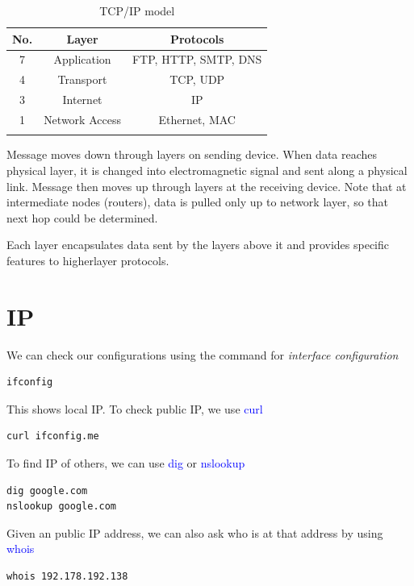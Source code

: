 \documentclass[a4paper, 12pt]{book} %
\begin{document}
\begin{longtable}{|c|c|c|} \hline 
    No. & Layer & Protocols \\ \hline 
    7 & Application & FTP, HTTP, SMTP, DNS \\ \hline 
    4 & Transport & TCP, UDP \\ \hline 
    3 & Internet & IP \\ \hline 
    1 & Network Access & Ethernet, MAC \\ \hline 
    \caption{TCP/IP model}
\end{longtable}

Message moves down through layers on sending device. When data reaches physical layer, it is changed into electromagnetic signal and sent along a physical link. Message then moves up through layers at the receiving device. Note that at intermediate nodes (routers), data is pulled only up to network layer, so that next hop could be determined.

Each layer encapsulates data sent by the layers above it and provides specific features to higherlayer protocols.







\section{IP}

We can check our configurations using the command for \emph{interface configuration}
\begin{lstlisting}[style=darkbash, language=bash]
ifconfig
\end{lstlisting}
This shows local IP. To check public IP, we use \textcolor{blue}{curl}
\begin{lstlisting}[style=darkbash, language=bash]
curl ifconfig.me
\end{lstlisting}
To find IP of others, we can use \textcolor{blue}{dig} or \textcolor{blue}{nslookup}
\begin{lstlisting}[style=darkbash, language=bash]
dig google.com
nslookup google.com
\end{lstlisting}
Given an public IP address, we can also ask who is at that address by using \textcolor{blue}{whois}
\begin{lstlisting}[style=darkbash, language=bash]
whois 192.178.192.138
\end{lstlisting}
\end{document}
